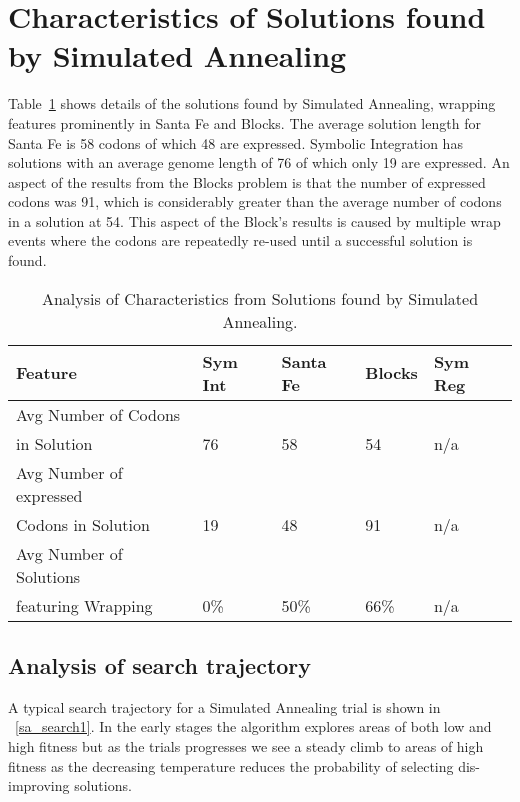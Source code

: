\section{Characteristics of Solutions found by Simulated Annealing}

Table~\ref{sa_results_analysis_table} shows details of the solutions found by Simulated Annealing, wrapping features prominently in Santa Fe and Blocks. The average solution length for Santa Fe is 58 codons of which 48 are expressed. Symbolic Integration has solutions with an average genome length of 76 of which only 19 are expressed. An aspect of the results from the Blocks problem is that the number of expressed codons was 91, which is considerably greater than the average number of codons in a solution at 54. This aspect of the Block's results is caused by multiple wrap events where the codons are repeatedly re-used until a successful solution is found.  


\begin{table}[h]
\begin{center}
\begin{tabular}{|l|l|l|l|l|}
\hline
Feature & Sym Int & Santa Fe & Blocks & Sym Reg  \\
\hline
Avg Number of Codons & & & &  \\ 
in Solution & 76 & 58 & 54 & n/a  \\
Avg Number of expressed & & & &  \\
Codons in Solution & 19 & 48 & 91 & n/a  \\
Avg Number of Solutions & & & &  \\
featuring Wrapping & 0\% & 50\% & 66\% & n/a  \\
\hline
\end{tabular}
\caption{\label{sa_results_analysis_table} Analysis of Characteristics from Solutions found by Simulated Annealing.}
\end{center}
\end{table}




\subsection{Analysis of search trajectory}

A typical search trajectory for a Simulated Annealing trial is shown in ~\ref{sa_search1}. In the early stages the algorithm explores areas of both low and high fitness but as the trials progresses we see a steady climb to areas of high fitness as the decreasing temperature reduces the probability of selecting dis-improving solutions.

